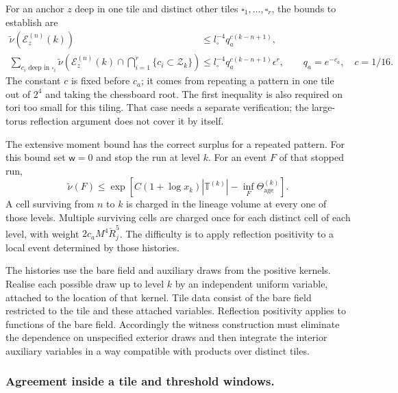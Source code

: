 \documentclass[11pt,letterpaper,reqno]{amsart}
\theoremstyle{definition}
\theoremstyle{remark}
\begin{document}
For an anchor $z$ deep in one tile and distinct other tiles
$\square_1,\ldots,\square_r$, the bounds to establish are
\begin{equation}\label{eq:mrg-history-chessboard}
 \begin{split}
 \widetilde\nu(\mathcal E_z^{(n)}(k))
       &\le l_\square^{-4}q_a^{c(k-n+1)},\\
 \sum_{c_i\text{ deep in }\square_i}
 \widetilde\nu\!\left(\mathcal E_z^{(n)}(k)
                 \cap\bigcap_{i=1}^r\{c_i\subset\mathcal Z_k\}\right)
       &\le l_\square^{-4}q_a^{c(k-n+1)}\epsilon^r,
             \qquad q_a=e^{-c_a},\quad c=1/16.
 \end{split}
\end{equation}
The constant $c$ is fixed before $c_a$; it comes from repeating
a pattern in one tile out of $2^4$ and taking the chessboard
root. The first inequality is also required on tori too small
for this tiling. That case needs a separate verification; the
large-torus reflection argument does not cover it by itself.

The extensive moment bound has the correct surplus for a repeated
pattern. For this bound set $\mathsf w=0$ and stop the run at
level $k$. For an event $F$ of that stopped run,
\[
 \widetilde\nu(F)
 \le\exp\!\left[C(1+\log x_k)|\mathbb T^{(k)}|
                   -\inf_F\Theta_{\mathrm{age}}^{(k)}\right].
\]
A cell surviving from $n$ to $k$ is charged in the lineage volume
at every one of those levels. Multiple surviving cells are charged
once for each distinct cell of each level, with weight
$2c_aM^4\check R_j^5$. The difficulty is to apply reflection
positivity to a local event determined by those histories.

The histories use the bare field and auxiliary draws from the
positive kernels. Realise each possible draw up to level $k$ by
an independent uniform variable, attached to the location of that
kernel. Tile data consist of the bare field restricted to the
tile and these attached variables. Reflection positivity applies
to functions of the bare field. Accordingly the witness construction
must eliminate the dependence on unspecified exterior draws and
then integrate the interior auxiliary variables in a way compatible
with products over distinct tiles.

\subsubsection*{Agreement inside a tile and threshold windows.}
\end{document}
